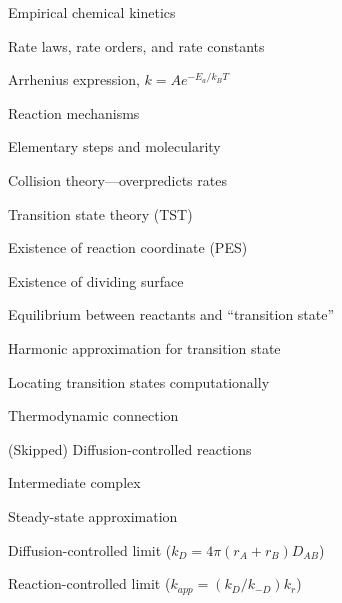 \message{ !name(Outline.tex)}\documentclass[11pt]{article}
\begin{document}
\begin{outline}
\begin{outline}
  \item Empirical chemical kinetics
    \begin{outline}
    \item Rate laws, rate orders, and rate constants
    \item Arrhenius expression, $k=A e^{-E_a/k_BT}$
    \end{outline}
  \item Reaction mechanisms
  \item Elementary steps and molecularity
  \item Collision theory---overpredicts rates
  \item Transition state theory (TST)
    \begin{outline}
    \item Existence of reaction coordinate (PES)
    \item Existence of dividing surface
    \item Equilibrium between reactants and ``transition state''
    \item Harmonic approximation for transition state
    \end{outline}
  \item Locating transition states computationally
  \item Thermodynamic connection 
  \item (Skipped) Diffusion-controlled reactions 
    \begin{outline}
      \item Intermediate complex
      \item Steady-state approximation
      \item Diffusion-controlled limit ($k_D = 4\pi (r_A + r_B) D_{AB}$)
      \item Reaction-controlled limit ($k_{app}=(k_D/k_{-D})k_r$)
    \end{outline}

  \end{outline}


\end{outline}
\end{document}
